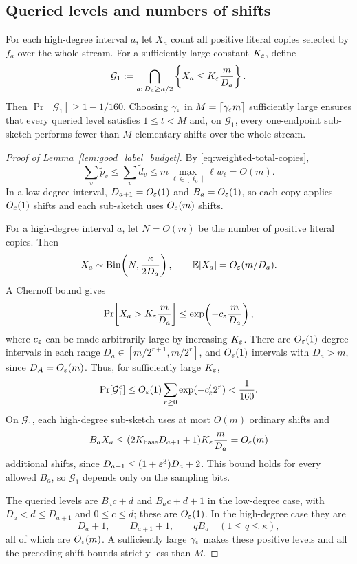 \subsection{Queried levels and numbers of shifts}
\label{app:one-endpoint-budget-proof}

\begin{restatedoneendpointbudgetlemma}
For each high-degree interval $a$, let $X_a$ count all positive literal copies selected by $f_a$ over the whole stream. For a sufficiently large constant $K_\varepsilon$, define
\[
\mathcal G_1:=
\bigcap_{a:\,D_a\ge\kappa/2}
\left\{X_a\le K_\varepsilon\frac{m}{D_a}\right\}.
\]
Then $\Pr[\mathcal G_1]\ge1-1/160$. Choosing $\gamma_\varepsilon$ in $M=\lceil\gamma_\varepsilon m\rceil$ sufficiently large ensures that every queried level satisfies $1\le t<M$ and, on $\mathcal G_1$, every one-endpoint sub-sketch performs fewer than $M$ elementary shifts over the whole stream.
\end{restatedoneendpointbudgetlemma}

\begin{proof}[Proof of Lemma~\ref{lem:good_label_budget}]
By \eqref{eq:weighted-total-copies},
\[
\sum_v\widetilde p_v\le\sum_v\widetilde d_v
\le m\max_{\ell\in[\ell_0]}\ell w_\ell=O(m).
\]
In a low-degree interval, $D_{a+1}=O_\varepsilon(1)$ and $B_a=O_\varepsilon(1)$, so each copy applies $O_\varepsilon(1)$ shifts and each sub-sketch uses $O_\varepsilon(m)$ shifts.

For a high-degree interval $a$, let $N=O(m)$ be the number of positive literal copies. Then
\[
X_a\sim\mathrm{Bin}\!\left(N,\frac{\kappa}{2D_a}\right),
\qquad
\mathbb E[X_a]=O_\varepsilon(m/D_a).
\]
A Chernoff bound gives
\[
\Pr\!\left[X_a>K_\varepsilon\frac{m}{D_a}\right]
\le\exp\!\left(-c_\varepsilon\frac{m}{D_a}\right),
\]
where $c_\varepsilon$ can be made arbitrarily large by increasing $K_\varepsilon$. There are $O_\varepsilon(1)$ degree intervals in each range $D_a\in[m/2^{r+1},m/2^r]$, and $O_\varepsilon(1)$ intervals with $D_a>m$, since $D_A=O_\varepsilon(m)$. Thus, for sufficiently large $K_\varepsilon$,
\[
\Pr[\mathcal G_1^c]
\le O_\varepsilon(1)\sum_{r\ge0}\exp(-c'_\varepsilon 2^r)
<\frac1{160}.
\]
On $\mathcal G_1$, each high-degree sub-sketch uses at most $O(m)$ ordinary shifts and
\[
B_aX_a
\le(2K_{\mathrm{base}}D_{a+1}+1)K_\varepsilon\frac{m}{D_a}
=O_\varepsilon(m)
\]
additional shifts, since $D_{a+1}\le(1+\varepsilon^3)D_a+2$. This bound holds for every allowed $B_a$, so $\mathcal G_1$ depends only on the sampling bits.

The queried levels are $B_ac+d$ and $B_ac+d+1$ in the low-degree case, with $D_a<d\le D_{a+1}$ and $0\le c\le d$; these are $O_\varepsilon(1)$. In the high-degree case they are
\[
D_a+1,\qquad D_{a+1}+1,\qquad qB_a\quad(1\le q\le\kappa),
\]
all of which are $O_\varepsilon(m)$. A sufficiently large $\gamma_\varepsilon$ makes these positive levels and all the preceding shift bounds strictly less than $M$.
\end{proof}

